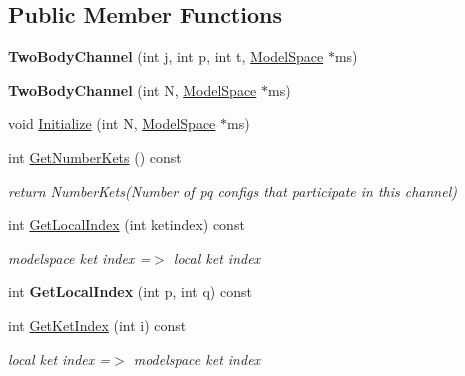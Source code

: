 \subsection*{Public Member Functions}
\begin{DoxyCompactItemize}
\item 
\mbox{\label{classTwoBodyChannel_af9b4f971e24b254b1c8bee51310f02a1}} 
{\bfseries Two\+Body\+Channel} (int j, int p, int t, \hyperlink{classModelSpace}{Model\+Space} $\ast$ms)
\item 
\mbox{\label{classTwoBodyChannel_a77f02ae715ac81c4d9915388c35a1941}} 
{\bfseries Two\+Body\+Channel} (int N, \hyperlink{classModelSpace}{Model\+Space} $\ast$ms)
\item 
void \hyperlink{classTwoBodyChannel_abe82c6109a1de6cfe94e8bb88b84cdc2}{Initialize} (int N, \hyperlink{classModelSpace}{Model\+Space} $\ast$ms)
\item 
\mbox{\label{classTwoBodyChannel_adaa6d12ab3ece4a669af12f5dfedb370}} 
int \hyperlink{classTwoBodyChannel_adaa6d12ab3ece4a669af12f5dfedb370}{Get\+Number\+Kets} () const
\begin{DoxyCompactList}\small\item\em return Number\+Kets(\+Number of pq configs that participate in this channel) \end{DoxyCompactList}\item 
\mbox{\label{classTwoBodyChannel_a5197ccb18558efb246099aa1ff3c5a14}} 
int \hyperlink{classTwoBodyChannel_a5197ccb18558efb246099aa1ff3c5a14}{Get\+Local\+Index} (int ketindex) const
\begin{DoxyCompactList}\small\item\em modelspace ket index =$>$ local ket index \end{DoxyCompactList}\item 
\mbox{\label{classTwoBodyChannel_a2224b31880155cce31003b793ca65d68}} 
int {\bfseries Get\+Local\+Index} (int p, int q) const
\item 
\mbox{\label{classTwoBodyChannel_a60a839eda4d1569f0f27da627be1bce6}} 
int \hyperlink{classTwoBodyChannel_a60a839eda4d1569f0f27da627be1bce6}{Get\+Ket\+Index} (int i) const
\begin{DoxyCompactList}\small\item\em local ket index =$>$ modelspace ket index \end{DoxyCompactList}\item 

\end{DoxyCompactItemize}
